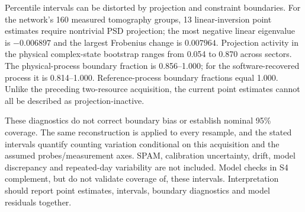 \documentclass[10pt,a4paper]{article}
\begin{document}
Percentile intervals can be distorted by projection and constraint boundaries. For the network's 160 measured tomography groups, 13 linear-inversion point estimates require nontrivial PSD projection; the most negative linear eigenvalue is $-0.006897$ and the largest Frobenius change is $0.007964$. Projection activity in the physical complex-state bootstrap ranges from 0.054 to 0.870 across sectors. The physical-process boundary fraction is 0.856--1.000; for the software-recovered process it is 0.814--1.000. Reference-process boundary fractions equal 1.000. Unlike the preceding two-resource acquisition, the current point estimates cannot all be described as projection-inactive.

These diagnostics do not correct boundary bias or establish nominal 95\% coverage. The same reconstruction is applied to every resample, and the stated intervals quantify counting variation conditional on this acquisition and the assumed probes/measurement axes. SPAM, calibration uncertainty, drift, model discrepancy and repeated-day variability are not included. Model checks in S4 complement, but do not validate coverage of, these intervals. Interpretation should report point estimates, intervals, boundary diagnostics and model residuals together.
\end{document}
